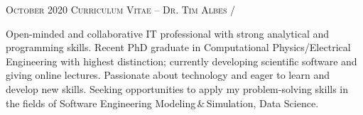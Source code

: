 \documentclass[12pt]{tym-cv}
\begin{document}
\maketitle

\makefooter%
{\textsc{October 2020}}
{\textsc{Curriculum Vitae -- Dr. Tim Albes}}
{\thepage /\pageref{LastPage}}

\begin{profile}
Open-minded and collaborative IT professional with strong analytical and programming skills. Recent PhD graduate in Computational Physics/Electrical Engineering with highest distinction; currently developing scientific software and giving online lectures. Passionate about technology and eager to learn and develop new skills. Seeking opportunities to apply my problem-solving skills in the fields of Software Engineering Modeling\,\&\,Simulation, Data Science.
\end{profile}
\end{document}
